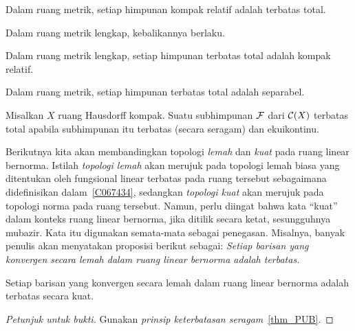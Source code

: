 \begin{prop} Dalam ruang metrik, setiap himpunan kompak relatif adalah terbatas total.
\end{prop}

Dalam ruang metrik lengkap, kebalikannya berlaku.

\begin{prop} Dalam ruang metrik lengkap, setiap himpunan terbatas total adalah kompak relatif.
\end{prop}

\begin{prop} Dalam ruang metrik, setiap himpunan terbatas total adalah separabel.
\end{prop}

\begin{thm}\label{AAThm} Misalkan $X$ ruang Hausdorff kompak. Suatu subhimpunan $\mathcal{F}$
dari $\mathcal{C}(X)$ terbatas total apabila subhimpunan itu terbatas (secara seragam) dan ekuikontinu.
\end{thm}

Berikutnya kita akan membandingkan topologi \emph{lemah} dan \emph{kuat} pada ruang linear bernorma.
Istilah
\emph{topologi lemah} akan merujuk pada topologi lemah biasa yang ditentukan oleh fungsional linear terbatas
pada ruang tersebut sebagaimana didefinisikan dalam~\ref{C067434}, sedangkan \emph{topologi kuat} akan merujuk pada topologi norma pada ruang tersebut.
Namun, perlu diingat bahwa kata ``kuat'' dalam konteks ruang linear bernorma, jika ditilik secara ketat,
sesungguhnya mubazir.  Kata itu digunakan semata-mata sebagai penegasan.  Misalnya, banyak penulis akan menyatakan proposisi berikut sebagai:
\emph{Setiap barisan yang konvergen secara lemah dalam ruang linear bernorma adalah terbatas.}

\begin{prop} Setiap barisan yang konvergen secara lemah dalam ruang linear bernorma adalah terbatas secara kuat.
\end{prop}

\begin{proof}[\emph{Petunjuk untuk bukti}] Gunakan \emph{prinsip keterbatasan seragam}~\ref{thm_PUB}. \ns
\end{proof}

